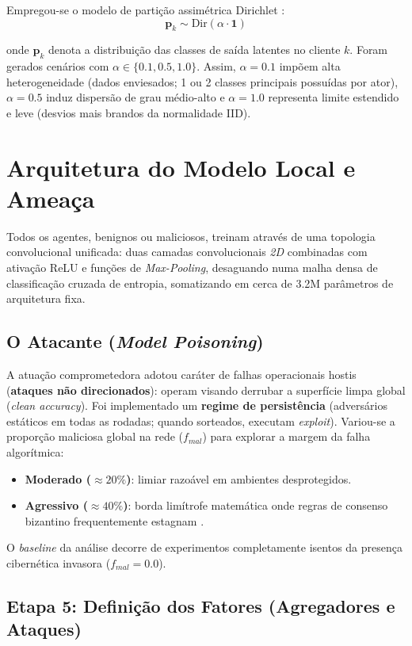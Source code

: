 Empregou-se o modelo de partição assimétrica Dirichlet \cite{Hsu2019}:
\begin{equation}
    \mathbf{p}_k \sim \text{Dir}(\alpha \cdot \mathbf{1})
\end{equation}

onde $\mathbf{p}_k$ denota a distribuição das classes de saída latentes no cliente $k$.
Foram gerados cenários com $\alpha \in \{0.1, 0.5, 1.0\}$. Assim, $\alpha=0.1$ impõem alta heterogeneidade (dados enviesados; 1 ou 2 classes principais possuídas por ator), $\alpha=0.5$ induz dispersão de grau médio-alto e $\alpha=1.0$ representa limite estendido e leve (desvios mais brandos da normalidade IID).

\section{Arquitetura do Modelo Local e Ameaça}

Todos os agentes, benignos ou maliciosos, treinam através de uma topologia convolucional unificada: duas camadas convolucionais \textit{2D} combinadas com ativação ReLU e funções de \textit{Max-Pooling}, desaguando numa malha densa de classificação cruzada de entropia, somatizando em cerca de 3.2M parâmetros de arquitetura fixa.

\subsection{O Atacante (\textit{Model Poisoning})}
A atuação comprometedora adotou caráter de falhas operacionais hostis (\textbf{ataques não direcionados}): operam visando derrubar a superfície limpa global (\textit{clean accuracy}).
Foi implementado um \textbf{regime de persistência} (adversários estáticos em todas as rodadas; quando sorteados, executam \textit{exploit}). Variou-se a proporção maliciosa global na rede ($f_{mal}$) para explorar a margem da falha algorítmica:
\begin{itemize}
    \item \textbf{Moderado ($\approx20\%$)}: limiar razoável em ambientes desprotegidos.
    \item \textbf{Agressivo ($\approx40\%$)}: borda limítrofe matemática onde regras de consenso bizantino frequentemente estagnam \cite{Blanchard2017,Sagar2023}.
\end{itemize}
O \textit{baseline} da análise decorre de experimentos completamente isentos da presença cibernética invasora ($f_{mal}=0.0$).

\subsection{Etapa 5: Definição dos Fatores (Agregadores e Ataques)}

